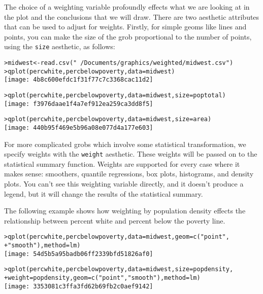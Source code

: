 \noindent The choice of a weighting variable profoundly effects what we are looking at in the plot and the conclusions that we will draw.  There are two aesthetic attributes that can be used to adjust for weights.  Firstly, for simple geoms like lines and points, you can make the size of the grob proportional to the number of points, using the {\tt size} aesthetic, as follows:

\begin{alltt}
> midwest <- read.csv("~/Documents/graphics/weighted/midwest.csv")
> qplot(percwhite, percbelowpoverty, data = midwest)
\texttt{[image: 4b8c600efdc1f31f77c7c3368cac11d2]}

> qplot(percwhite, percbelowpoverty, data = midwest, size = poptotal)
\texttt{[image: f3976daae1f4a7ef912ea259ca3dd8f5]}

> qplot(percwhite, percbelowpoverty, data = midwest, size = area)
\texttt{[image: 440b95f469e5b96a08e077d4a177e603]}

\end{alltt}

For more complicated grobs which involve some statistical transformation, we specify weights with the {\tt weight} aesthetic.  These weights will be passed on to the statistical summary function.  Weights are supported for every case where it makes sense: smoothers, quantile regressions, box plots, histograms, and density plots.  You can't see this weighting variable directly, and it doesn't produce a legend, but it will change the results of the statistical summary.

The following example shows how weighting by population density effects the relationship between percent white and percent below the poverty line.

\begin{alltt}
> qplot(percwhite, percbelowpoverty, data = midwest, geom = c("point", 
+     "smooth"), method = lm)
\texttt{[image: 54d5b5a95badb06ff2339bfd51826af0]}

> qplot(percwhite, percbelowpoverty, data = midwest, size = popdensity, 
+     weight = popdensity, geom = c("point", "smooth"), method = lm)
\texttt{[image: 3353081c3ffa3fd62b69fb2c0aef9142]}

\end{alltt}

